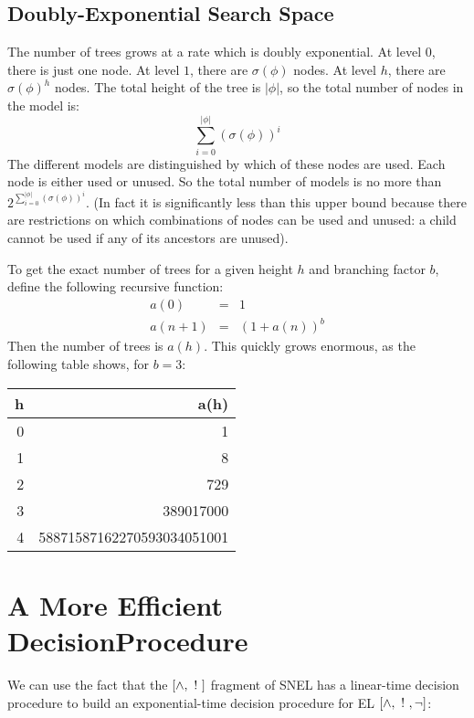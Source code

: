 \subsection{Doubly-Exponential Search Space}
The number of trees grows at a rate which is doubly exponential.
At level $0$, there is just one node.
At level $1$, there are $\sigma(\phi)$ nodes.
At level $h$, there are $\sigma(\phi)^h$ nodes.
The total height of the tree is $|\phi|$, so the total number of nodes in the model is:
\[
\sum_{i=0}^{|\phi|} (\sigma(\phi))^i
\]
The different models are distinguished by which of these nodes are used. 
Each node is either used or unused.
So the total number of models is no more than $2 ^ {\sum_{i=0}^{|\phi|} (\sigma(\phi))^i}$.
(In fact it is significantly less than this upper bound because there are restrictions on which combinations of nodes can be used and unused: a child cannot be used if any of its ancestors are unused).

To get the exact number of trees for a given height $h$ and branching factor $b$, define the following recursive function:
\begin{eqnarray}
a(0) & = & 1\nonumber \\
a(n+1) & = & (1+a(n))^b \nonumber
\end{eqnarray}
Then the number of trees is $a(h)$.
This quickly grows enormous, as the following table shows, for $b = 3$:
\begin{center}
\begin{tabular}{ r | r }
h & a(h) \\
\hline
0 & 1 \\
1 & 8 \\
2 & 729 \\
3 & 389017000 \\
4 & 58871587162270593034051001
\end{tabular}
\end{center}
    
\section{A More Efficient DecisionProcedure}
We can use the fact that the $[\land, \ ! \ ]$ fragment of SNEL has a linear-time decision procedure to build an exponential-time decision procedure for EL $[\land, \ ! \ , \neg]$:

